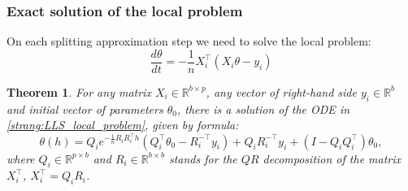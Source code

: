 \documentclass{article} %
\newtheorem{theorem}{Theorem}
\begin{document}
\subsubsection{Exact solution of the local problem}
On each splitting approximation step we need to solve the local problem:
\begin{equation}\label{strang:LLS_local_problem}
\dfrac{d \theta}{d t} = - \dfrac{1}{n} X_i^\top( X_i \theta - y_i)
\end{equation}
\begin{theorem}\label{strang:LLS_local_solution} For any matrix $X_i \in \mathbb{R}^{b \times p}$, any vector of right-hand side $y_i \in \mathbb{R}^{b}$ and initial vector of parameters $\theta_0$, there is a solution of the ODE in \ref{strang:LLS_local_problem}, given by formula:
$$
\theta(h) = Q_i e^{-\frac{1}{n}R_iR_i^\top h} \left( Q_i^\top \theta_0 - R_i^{-\top}y_i\right) + Q_iR_i^{-\top}y_i + (I - Q_iQ_i^\top)\theta_0,
$$ 
where $Q_i \in \mathbb{R}^{p \times b}$ and $R_i \in \mathbb{R}^{b \times b}$ stands for the $QR$ decomposition of the matrix $X_i^\top$, $X_i^\top = Q_i R_i$.
\end{theorem}
\end{document}
